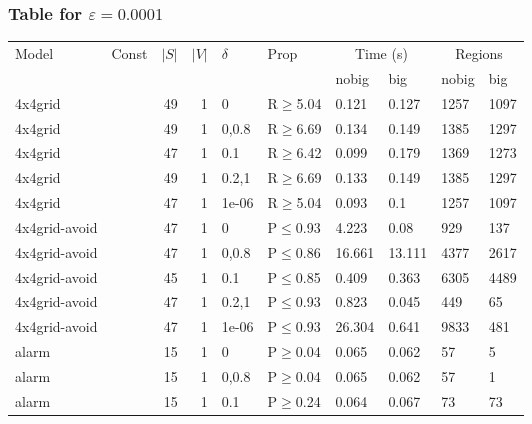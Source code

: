 \subsubsection{Table for \(\varepsilon=0.0001\)}
\begin{longtable}{llrrllllll}

        \toprule
        Model & Const & $|S|$ & $|V|$ & $\delta$ & Prop & \multicolumn{2}{c}{Time (s)} & \multicolumn{2}{c}{Regions} \\
        \cmidrule(ll){7-8} \cmidrule(ll){9-10}
        & & & & & & nobig & big & nobig & big \\
        \midrule
        
 4x4grid       &          &     	49 & 1 & 0     & R$\geq$5.04  & 0.121    & 0.127    & 1257    & 1097    \\
 4x4grid       &          &     	49 & 1 & 0,0.8 & R$\geq$6.69  & 0.134    & 0.149    & 1385    & 1297    \\
 4x4grid       &          &     	47 & 1 & 0.1   & R$\geq$6.42  & 0.099    & 0.179    & 1369    & 1273    \\
 4x4grid       &          &     	49 & 1 & 0.2,1 & R$\geq$6.69  & 0.133    & 0.149    & 1385    & 1297    \\
 4x4grid       &          &     	47 & 1 & 1e-06 & R$\geq$5.04  & 0.093    & 0.1      & 1257    & 1097    \\
 4x4grid-avoid &          &     	47 & 1 & 0     & P$\leq$0.93  & 4.223    & 0.08     & 929     & 137     \\
 4x4grid-avoid &          &     	47 & 1 & 0,0.8 & P$\leq$0.86  & 16.661   & 13.111   & 4377    & 2617    \\
 4x4grid-avoid &          &     	45 & 1 & 0.1   & P$\leq$0.85  & 0.409    & 0.363    & 6305    & 4489    \\
 4x4grid-avoid &          &     	47 & 1 & 0.2,1 & P$\leq$0.93  & 0.823    & 0.045    & 449     & 65      \\
 4x4grid-avoid &          &     	47 & 1 & 1e-06 & P$\leq$0.93  & 26.304   & 0.641    & 9833    & 481     \\
 alarm         &          &     	15 & 1 & 0     & P$\geq$0.04  & 0.065    & 0.062    & 57      & 5       \\
 alarm         &          &     	15 & 1 & 0,0.8 & P$\geq$0.04  & 0.065    & 0.062    & 57      & 1       \\
 alarm         &          &     	15 & 1 & 0.1   & P$\geq$0.24  & 0.064    & 0.067    & 73      & 73      \\

\end{longtable}
